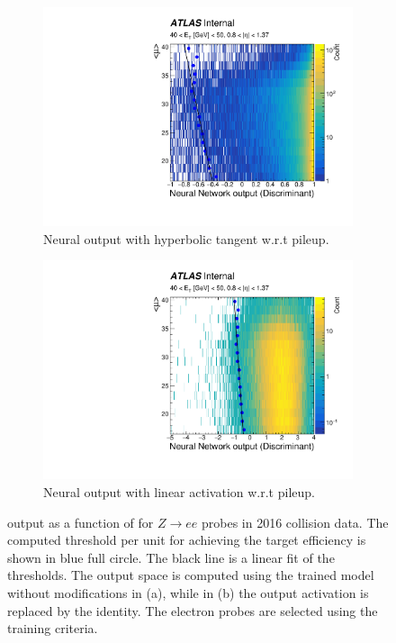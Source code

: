 \begin{figure}[h!tb]
  \begin{center}
  \begin{subfigure}[c]{.48\textwidth}
  \centering
  \includegraphics[width=\textwidth]{sections/tuning_strategy/figures/hist2D_signal_pileupCorrection_with_tansig_et3_eta1.pdf}
  \caption{Neural output with hyperbolic tangent w.r.t pileup.}
  \label{fig:nn_correction_with_tansig}
  \end{subfigure}
  \hfill
  \begin{subfigure}[c]{.48\textwidth}
  \centering
  \includegraphics[width=\textwidth]{sections/tuning_strategy/figures/hist2D_signal_pileupCorrection_without_tansig_et3_eta1.pdf}
  \caption{Neural output with linear activation w.r.t pileup.}
  \label{fig:nn_correction_without_tansig}
  \end{subfigure}
  \caption{
    \rnn output as a function of \avgmu{} for $Z\rightarrow ee$ probes in 
    2016 collision data.
    The computed threshold per \avgmu{} unit for achieving the target 
    efficiency is shown in blue full circle. The black line is a linear fit of the thresholds.
    The output space is computed using the trained model without modifications 
    in (a), while in (b) the output activation is replaced by the identity.
    The electron probes are selected using the training criteria.
  }%
  \end{center}
  \end{figure}
